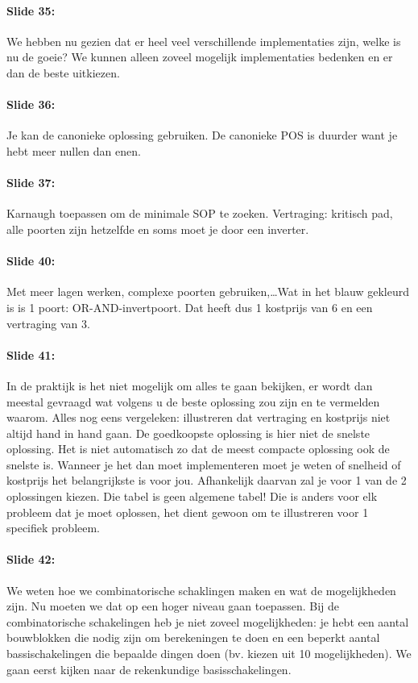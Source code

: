 \documentclass[10pt,a4paper]{book}
\begin{document}
\paragraph{Slide 35:} We hebben nu gezien dat er heel veel verschillende implementaties zijn, welke is nu de goeie? We kunnen alleen zoveel mogelijk implementaties bedenken en er dan de beste uitkiezen.

\paragraph{Slide 36:} Je kan de canonieke oplossing gebruiken. De canonieke POS is duurder want je hebt meer nullen dan enen.

\paragraph{Slide 37:} Karnaugh toepassen om de minimale SOP te zoeken. Vertraging: kritisch pad, alle poorten zijn hetzelfde en soms moet je door een inverter. 

\paragraph{Slide 40:} Met meer lagen werken, complexe poorten gebruiken,\ldots Wat in het blauw gekleurd is is 1 poort: OR-AND-invertpoort. Dat heeft dus 1 kostprijs van 6 en een vertraging van 3.

\paragraph{Slide 41:} In de praktijk is het niet mogelijk om alles te gaan bekijken, er wordt dan meestal gevraagd wat volgens u de beste oplossing zou zijn en te vermelden waarom. Alles nog eens vergeleken: illustreren dat vertraging en kostprijs niet altijd hand in hand gaan. De goedkoopste oplossing is hier niet de snelste oplossing. Het is niet automatisch zo dat de meest compacte oplossing ook de snelste is. Wanneer je het dan moet implementeren moet je weten of snelheid of kostprijs het belangrijkste is voor jou. Afhankelijk daarvan zal je voor 1 van de 2 oplossingen kiezen. Die tabel is geen algemene tabel! Die is anders voor elk probleem dat je moet oplossen, het dient gewoon om te illustreren voor 1 specifiek probleem.

\paragraph{Slide 42:} We weten hoe we combinatorische schaklingen maken en wat de mogelijkheden zijn. Nu moeten we dat op een hoger niveau gaan toepassen. Bij de combinatorische schakelingen heb je niet zoveel mogelijkheden: je hebt een aantal bouwblokken die nodig zijn om berekeningen te doen en een beperkt aantal bassischakelingen die bepaalde dingen doen (bv. kiezen uit 10 mogelijkheden). We gaan eerst kijken naar de rekenkundige basisschakelingen.
\end{document}
